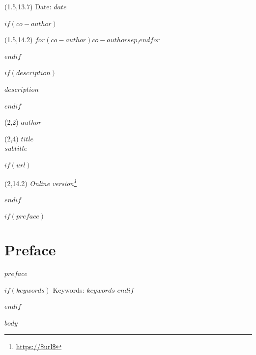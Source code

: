\documentclass[a4paper,$if(font-size)$$font-size$$else$12$endif$pt,openany]{book}
\DeclareRobustCommand{\href}[2]{#2\footnote{\url{#1}}}
\begin{document}
\begin{textblock}{12}(1.5,13.7)
\noindent\fontsize{11}{11}\selectfont Date: $date$
\end{textblock}

$if(co-author)$
\begin{textblock}{12}(1.5,14.2)
\noindent\fontsize{11}{11}\selectfont $for(co-author)$$co-author$$sep$,$endfor$
\end{textblock}
$endif$
\hspace{1pt}
\newpage

\onehalfspacing
$if(description)$
\thispagestyle{empty}
\noindent

$description$

\newpage
$endif$

\thispagestyle{empty}

\begin{textblock}{12}(2,2)
\noindent\fontsize{20}{20}\selectfont $author$
\end{textblock}

\begin{textblock}{12}(2,4)
\noindent\fontsize{35pt}{40pt}\selectfont $title$\\
\fontsize{20pt}{40pt}\selectfont \emph{$subtitle$}
\end{textblock}

$if(url)$
\begin{textblock}{12}(2,14.2)
\noindent\fontsize{16}{11}\selectfont \emph{\href{https://$url$}{Online version}}
\end{textblock}
$endif$

\hspace{1pt}
\newpage

$if(preface)$
\chapter*{Preface}

$preface$

$if(keywords)$
\vspace{5pt}
\noindent Keywords: \emph{$keywords$}
$endif$

\newpage
$endif$

\begin{spacing}{1}
\tableofcontents
\end{spacing}

\newpage

\setcounter{page}{1}
\pagestyle{fancy}
\fancyhf{}
\renewcommand{\headrulewidth}{0pt}
\fancyhead[LE]{\fontsize{11}{12} \selectfont\nouppercase{\thepage}}
\fancyhead[RE]{\fontsize{11}{12} \selectfont\nouppercase{\leftmark}}
\fancyhead[LO]{\fontsize{11}{12} \selectfont\nouppercase{\rightmark}}
\fancyhead[RO]{\fontsize{11}{12} \selectfont\nouppercase{\thepage}}
\allowdisplaybreaks
\setlength{\abovedisplayskip}{10pt}
\setlength{\belowdisplayskip}{10pt}
\setlength{\abovedisplayshortskip}{-12pt}%
\setlength{\belowdisplayshortskip}{0pt}
$body$
\end{document}
